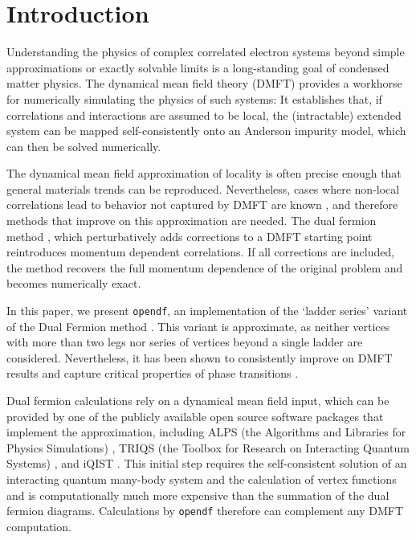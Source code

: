 \documentclass[3p,times,procedia]{elsarticle}
\begin{document}
\vspace*{-8pt}

\section{Introduction}

Understanding the physics of complex correlated electron systems beyond simple approximations or exactly solvable limits is a long-standing goal of condensed matter physics. The dynamical mean field theory (DMFT) \cite{MetznerVollhardt:1989,MH89,Georges92,Jarrell92,Georges1996,KotliarSavrasov:2006} provides a workhorse for numerically simulating the physics of such systems: It establishes that, if correlations and interactions are assumed to be local, the (intractable) extended system can be mapped self-consistently onto an  Anderson impurity model, which can then be solved numerically.

The dynamical mean field approximation of locality is often precise enough that general materials trends can be reproduced. Nevertheless, cases where non-local correlations lead to behavior not captured by DMFT are known \cite{Lichtenstein2000,MaierJarrell:2005,Held2008,Fuchs2011}, and therefore methods that improve on this approximation are needed. The dual fermion method \cite{Rubtsov2008}, which perturbatively adds corrections to a DMFT starting point reintroduces momentum dependent correlations. If all corrections are included, the method recovers the full momentum dependence of the original problem and becomes numerically exact.

In this paper, we present \texttt{opendf}, an implementation of the `ladder series' variant of the Dual Fermion method \cite{HafermannLi:2009}. This variant is approximate, as neither vertices with more than two legs nor series of vertices beyond a single ladder are considered. Nevertheless, it has been shown to consistently improve on DMFT results \cite{Rubtsov2008,Brener2008,HafermannLi:2009,AntipovRubtsov:2011,Li2014,Otsuki2014} and capture critical properties of phase transitions \cite{Antipov2014}.

Dual fermion calculations rely on a dynamical mean field input, which can be provided by one of the publicly available open source software packages that implement the approximation, including ALPS (the Algorithms and Libraries for Physics Simulations) \cite{ALPS2}, TRIQS (the Toolbox for Research on Interacting Quantum Systems) \cite{TRIQS}, and iQIST \cite{iQIST}.
This initial step requires the self-consistent solution of an interacting quantum many-body system and the calculation of vertex functions \cite{Hafermann2013a,Gull2008b} and is computationally much more expensive than the summation of the dual fermion diagrams. Calculations by \texttt{opendf} therefore can complement any DMFT computation. 
\end{document}
